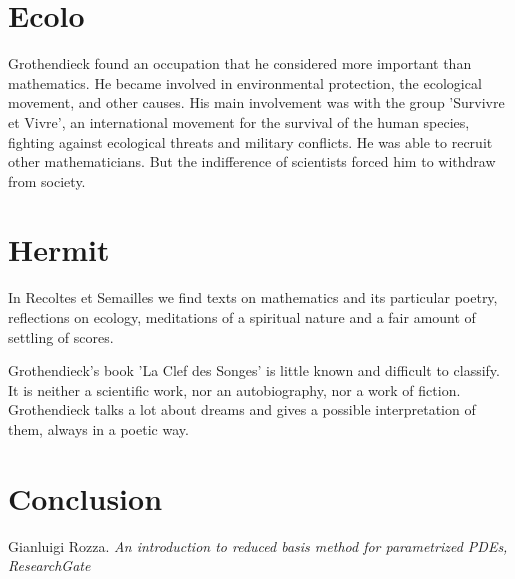 \documentclass[12pt]{article}
\begin{document}
\section{Ecolo}
\label{br}



Grothendieck found an occupation that he considered more important than mathematics. He became involved in environmental protection, the ecological movement, and other causes. His main involvement was with the group 'Survivre et Vivre', an international movement for the survival of the human species, fighting against ecological threats and military conflicts. 
He was able to recruit other mathematicians. But the indifference of scientists forced him to withdraw from society.





\section{Hermit}
\label{br}


In Recoltes et Semailles we find texts on mathematics and its particular poetry, reflections on ecology, meditations of a spiritual nature and a fair amount of settling of scores. 


Grothendieck's book 'La Clef des Songes' is little known and difficult to classify. It is neither a scientific work, nor an autobiography, nor a work of fiction. Grothendieck talks a lot about dreams and gives a possible interpretation of them, always in a poetic way.


\section{Conclusion}






\begin{thebibliography}{9}

Gianluigi Rozza.  \emph{An introduction to reduced basis method for parametrized PDEs, ResearchGate}

\end{thebibliography}
\end{document}
